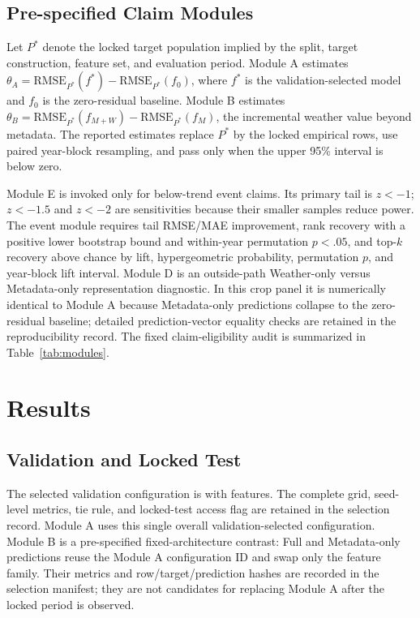 \documentclass[conference]{IEEEtran}
\renewcommand{\arraystretch}{0.98}
\begin{document}
\subsection{Pre-specified Claim Modules}
Let $P^\ast$ denote the locked target population implied by the split, target
construction, feature set, and evaluation period. Module A estimates
$\theta_A=\mathrm{RMSE}_{P^\ast}(f^\ast)-\mathrm{RMSE}_{P^\ast}(f_0)$, where
$f^\ast$ is the validation-selected model and $f_0$ is the zero-residual baseline.
Module B estimates
$\theta_B=\mathrm{RMSE}_{P^\ast}(f_{M+W})-\mathrm{RMSE}_{P^\ast}(f_M)$, the
incremental weather value beyond metadata. The reported estimates replace
$P^\ast$ by the locked empirical rows, use paired year-block resampling,
and pass only when the upper 95\% interval is below zero.

Module E is invoked only for below-trend event claims. Its primary tail is $z<-1$;
$z<-1.5$ and $z<-2$ are sensitivities because their smaller samples reduce power.
The event module requires tail RMSE/MAE improvement, rank recovery with a positive
lower bootstrap bound and within-year permutation $p<.05$, and top-$k$ recovery
above chance by lift, hypergeometric probability, permutation $p$, and year-block
lift interval. Module D is an outside-path Weather-only versus Metadata-only
representation diagnostic. In this crop panel it is numerically identical to
Module A because Metadata-only predictions collapse to the zero-residual baseline;
detailed prediction-vector equality checks are retained in the reproducibility
record. The fixed claim-eligibility audit is summarized in
Table~\ref{tab:modules}.

\begin{table}[t]
\centering
\caption{Fixed claim-eligibility modules and locked crop-panel verdicts. Module D
(Weather-only versus Metadata-only) is a descriptive representation diagnostic
outside the permission path and is therefore not a required row. Full
configuration details are in the reproducibility manifest.}
\label{tab:modules}
\footnotesize
\renewcommand{\arraystretch}{1.12}
\resizebox{\textwidth}{!}{}
\end{table}

\section{Results}
\subsection{Validation and Locked Test}
The selected validation configuration is \AuditSelectedModel{} with
\AuditSelectedFamily{} features. The complete
grid, seed-level metrics, tie rule, and locked-test access flag are retained in the
selection record. Module A uses this single overall validation-selected
configuration. Module B is a pre-specified fixed-architecture contrast: Full and
Metadata-only predictions reuse the Module A configuration ID and swap only the
feature family. Their metrics and row/target/prediction hashes are recorded in
the selection manifest; they are not candidates for replacing Module A after the
locked period is observed.
\end{document}
